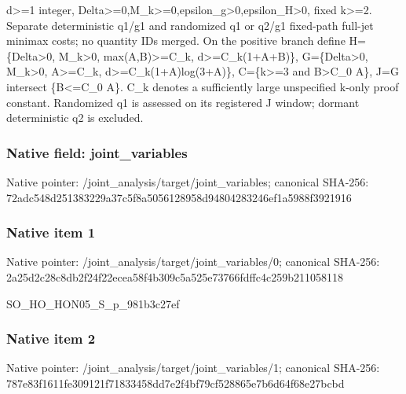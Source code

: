 \documentclass[10pt,a4paper]{article}
\begin{document}
\begingroup\raggedright\sloppy d>=\allowbreak{}1 integer,\allowbreak{} Delta>=\allowbreak{}0,\allowbreak{}M\_\allowbreak{}k>=\allowbreak{}0,\allowbreak{}epsilon\_\allowbreak{}g>0,\allowbreak{}epsilon\_\allowbreak{}H>0,\allowbreak{} fixed k>=\allowbreak{}2. Separate deterministic q1/\allowbreak{}g1 and randomized q1 or q2/\allowbreak{}g1 fixed-path full-jet minimax costs;\allowbreak{} no quantity IDs merged. On the positive branch define H=\allowbreak{}\{Delta>0,\allowbreak{} M\_\allowbreak{}k>0,\allowbreak{} max(A,\allowbreak{}B)>=\allowbreak{}C\_\allowbreak{}k,\allowbreak{} d>=\allowbreak{}C\_\allowbreak{}k(1+A+B)\},\allowbreak{} G=\allowbreak{}\{Delta>0,\allowbreak{} M\_\allowbreak{}k>0,\allowbreak{} A>=\allowbreak{}C\_\allowbreak{}k,\allowbreak{} d>=\allowbreak{}C\_\allowbreak{}k(1+A)log(3+A)\},\allowbreak{} C=\allowbreak{}\{k>=\allowbreak{}3 and B>C\_\allowbreak{}0 A\},\allowbreak{} J=\allowbreak{}G intersect \{B<=\allowbreak{}C\_\allowbreak{}0 A\}. C\_\allowbreak{}k denotes a sufficiently large unspecified k-only proof constant. Randomized q1 is assessed on its registered J window;\allowbreak{} dormant deterministic q2 is excluded.\par\endgroup

\subsubsection{Native field: joint\_\allowbreak{}variables}
Native pointer: /joint\_\allowbreak{}analysis/target/joint\_\allowbreak{}variables; canonical SHA-256: 72adc548d251383229a37c5f8a5056128958d94804283246ef1a5988f3921916

\subsubsection{Native item 1}
Native pointer: /joint\_\allowbreak{}analysis/target/joint\_\allowbreak{}variables/0; canonical SHA-256: 2a25d2c28c8db2f24f22ecea58f4b309c5a525e73766fdffc4c259b211058118

\begingroup\raggedright\sloppy SO\_\allowbreak{}HO\_\allowbreak{}HON05\_\allowbreak{}S\_\allowbreak{}p\_\allowbreak{}981b3c27ef\par\endgroup

\subsubsection{Native item 2}
Native pointer: /joint\_\allowbreak{}analysis/target/joint\_\allowbreak{}variables/1; canonical SHA-256: 787e83f1611fe309121f71833458dd7e2f4bf79cf528865e7b6d64f68e27bcbd
\end{document}

